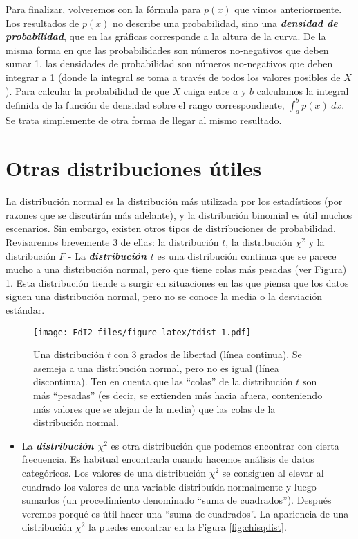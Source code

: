 \documentclass[spanish,]{book}
\providecommand{\tightlist}{%
  \setlength{\itemsep}{0pt}\setlength{\parskip}{0pt}}
\begin{document}
Para finalizar, volveremos con la fórmula para \(p(x)\) que vimos
anteriormente. Los resultados de \(p(x)\) no describe una probabilidad,
sino una \textbf{\emph{densidad de probabilidad}}, que en las gráficas
corresponde a la altura de la curva. De la misma forma en que las
probabilidades son números no-negativos que deben sumar 1, las
densidades de probabilidad son números no-negativos que deben integrar a
1 (donde la integral se toma a través de todos los valores posibles de
\(X\)). Para calcular la probabilidad de que \(X\) caiga entre \(a\) y
\(b\) calculamos la integral definida de la función de densidad sobre el
rango correspondiente, \(\int_a^b p(x) \ dx\). Se trata simplemente de
otra forma de llegar al mismo resultado.

\section{Otras distribuciones útiles}\label{otherdists}

La distribución normal es la distribución más utilizada por los
estadísticos (por razones que se discutirán más adelante), y la
distribución binomial es útil muchos escenarios. Sin embargo, existen
otros tipos de distribuciones de probabilidad. Revisaremos brevemente 3
de ellas: la distribución \(t\), la distribución \(\chi^2\) y la
distribución \(F\) - La \textbf{\emph{distribución \(t\)}} es una
distribución continua que se parece mucho a una distribución normal,
pero que tiene colas más pesadas (ver Figura) \ref{fig:tdist}. Esta
distribución tiende a surgir en situaciones en las que piensa que los
datos siguen una distribución normal, pero no se conoce la media o la
desviación estándar.

\begin{figure}
\centering
\texttt{[image: FdI2\_files/figure-latex/tdist-1.pdf]}
\caption{\label{fig:tdist}Una distribución \(t\) con 3 grados de libertad
(línea continua). Se asemeja a una distribución normal, pero no es igual
(línea discontinua). Ten en cuenta que las ``colas'' de la distribución
\(t\) son más ``pesadas'' (es decir, se extienden más hacia afuera,
conteniendo más valores que se alejan de la media) que las colas de la
distribución normal.}
\end{figure}

\begin{itemize}
\tightlist
\item
  La \textbf{\emph{distribución \(\chi^2\)}} es otra distribución que
  podemos encontrar con cierta frecuencia. Es habitual encontrarla
  cuando hacemos análisis de datos categóricos. Los valores de una
  distribución \(\chi^2\) se consiguen al elevar al cuadrado los valores
  de una variable distribuída normalmente y luego sumarlos (un
  procedimiento denominado ``suma de cuadrados''). Después veremos
  porqué es útil hacer una ``suma de cuadrados''. La apariencia de una
  distribución \(\chi^2\) la puedes encontrar en la Figura
  \ref{fig:chisqdist}.
\end{itemize}
\end{document}
